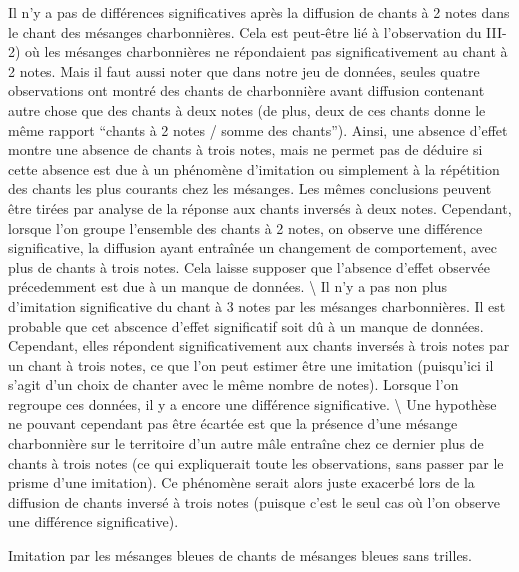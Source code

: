 \documentclass[
  french,
]{article}
\begin{document}
Il n'y a pas de différences significatives après la diffusion de chants
à 2 notes dans le chant des mésanges charbonnières. Cela est peut-être
lié à l'observation du III-2) où les mésanges charbonnières ne
répondaient pas significativement au chant à 2 notes. Mais il faut aussi
noter que dans notre jeu de données, seules quatre observations ont
montré des chants de charbonnière avant diffusion contenant autre chose
que des chants à deux notes (de plus, deux de ces chants donne le même
rapport ``chants à 2 notes / somme des chants''). Ainsi, une absence
d'effet montre une absence de chants à trois notes, mais ne permet pas
de déduire si cette absence est due à un phénomène d'imitation ou
simplement à la répétition des chants les plus courants chez les
mésanges. Les mêmes conclusions peuvent être tirées par analyse de la
réponse aux chants inversés à deux notes. Cependant, lorsque l'on groupe
l'ensemble des chants à 2 notes, on observe une différence
significative, la diffusion ayant entraînée un changement de
comportement, avec plus de chants à trois notes. Cela laisse supposer
que l'absence d'effet observée précedemment est due à un manque de
données. \textbackslash{} Il n'y a pas non plus d'imitation
significative du chant à 3 notes par les mésanges charbonnières. Il est
probable que cet abscence d'effet significatif soit dû à un manque de
données. Cependant, elles répondent significativement aux chants
inversés à trois notes par un chant à trois notes, ce que l'on peut
estimer être une imitation (puisqu'ici il s'agit d'un choix de chanter
avec le même nombre de notes). Lorsque l'on regroupe ces données, il y a
encore une différence significative. \textbackslash{} Une hypothèse ne
pouvant cependant pas être écartée est que la présence d'une mésange
charbonnière sur le territoire d'un autre mâle entraîne chez ce dernier
plus de chants à trois notes (ce qui expliquerait toute les
observations, sans passer par le prisme d'une imitation). Ce phénomène
serait alors juste exacerbé lors de la diffusion de chants inversé à
trois notes (puisque c'est le seul cas où l'on observe une différence
significative).

Imitation par les mésanges bleues de chants de mésanges bleues sans
trilles.
\end{document}
